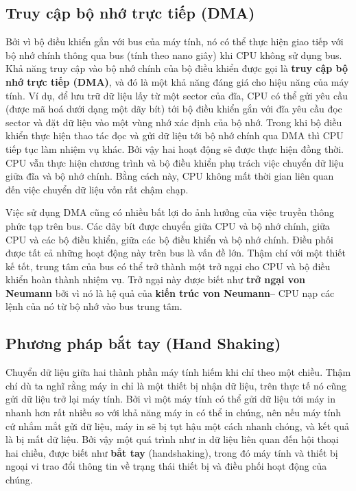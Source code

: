 \subsection*{Truy cập bộ nhớ trực tiếp (DMA)}
Bởi vì bộ điều khiển gắn với bus của máy tính, nó có thể thực hiện giao tiếp với bộ nhớ
chính thông qua bus (tính theo nano giây) khi CPU không sử dụng bus. Khả năng truy cập vào
bộ nhớ chính của bộ điều khiển được gọi là \textbf{truy cập bộ nhớ trực tiếp (DMA)}, và đó
là một khả năng đáng giá cho hiệu năng của máy tính. Ví dụ, để lưu trữ dữ liệu lấy từ một
sector của đĩa, CPU có thể gửi yêu cầu (được mã hoá dưới dạng một dãy bít) tới bộ điều
khiển gắn với đĩa yêu cầu đọc sector và đặt dữ liệu vào một vùng nhớ xác định của bộ
nhớ. Trong khi bộ điều khiển thực hiện thao tác đọc và gửi dữ liệu tới bộ nhớ chính qua
DMA thì CPU tiếp tục làm nhiệm vụ khác. Bởi vậy hai hoạt động sẽ được thực hiện đồng
thời. CPU vẫn thực hiện chương trình và bộ điều khiển phụ trách việc chuyển dữ liệu giữa
đĩa và bộ nhớ chính. Bằng cách này, CPU không mất thời gian liên quan đến việc chuyển dữ
liệu vốn rất chậm chạp.

Việc sử dụng DMA cũng có nhiều bất lợi do ảnh hưởng của việc truyền thông phức tạp trên
bus. Các dãy bít được chuyển giữa CPU và bộ nhớ chính, giữa CPU và các bộ điều khiển, giữa
các bộ điều khiển và bộ nhớ chính. Điều phối được tất cả những hoạt động này trên bus là
vấn đề lớn. Thậm chí với một thiết kế tốt, trung tâm của bus có thể trở thành một trở ngại
cho CPU và bộ điều khiển hoàn thành nhiệm vụ. Trở ngại này được biết như \textbf{trở ngại
  von Neumann} bởi vì nó là hệ quả của \textbf{kiến trúc von Neumann}-- CPU nạp các lệnh
của nó từ bộ nhớ vào bus trung tâm.

\subsection*{Phương pháp bắt tay (Hand Shaking)}

Chuyển dữ liệu giữa hai thành phần máy tính hiếm khi chỉ theo một chiều. Thậm chí dù ta
nghĩ rằng máy in chỉ là một thiết bị nhận dữ liệu, trên thực tế nó cũng gửi dữ liệu trở
lại máy tính. Bởi vì một máy tính có thể gửi dữ liệu tới máy in nhanh hơn rất nhiều so với
khả năng máy in có thể in chúng, nên nếu máy tính cứ nhắm mắt gửi dữ liệu, máy in sẽ bị
tụt hậu một cách nhanh chóng, và kết quả là bị mất dữ liệu. Bởi vậy một quá trình như in
dữ liệu liên quan đến hội thoại hai chiều, được biết như \textbf{bắt tay} (handshaking),
trong đó máy tính và thiết bị ngoại vi trao đổi thông tin về trạng thái thiết bị và điều
phối hoạt động của chúng.

